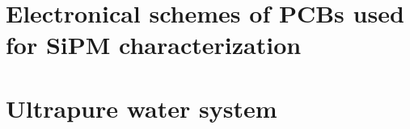 \documentclass[12pt,a4paper]{book}
\begin{document}
\chapter{Electronical schemes of PCBs used for SiPM characterization}\label{App:ElectronicalSchemesSiPMPCBs}


\chapter{Ultrapure water system }\label{App:UltraPureWaterSystem}



\end{document}
